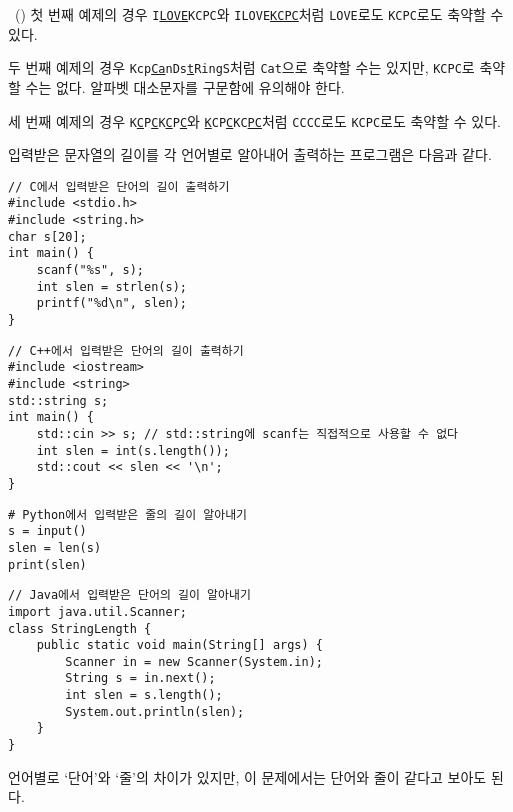\begin{problem}{\kcpcprobacronym\ (\kcpcprobacronymshort)}
    \Explanation
    첫 번째 예제의 경우 \texttt{I\underline{LOVE}KCPC}와 \texttt{ILOVE\underline{KCPC}}처럼 \texttt{LOVE}로도 \texttt{KCPC}로도 축약할 수 있다.
    
    두 번째 예제의 경우 \texttt{Kcp\underline{Ca}nDs\underline{t}RingS}처럼 \texttt{Cat}으로 축약할 수는 있지만, \texttt{KCPC}로 축약할 수는 없다. 알파벳 대소문자를 구문함에 유의해야 한다.
    
    세 번째 예제의 경우 \texttt{K\underline{C}P\underline{C}K\underline{C}P\underline{C}}와 \texttt{\underline{K}CP\underline{C}KC\underline{P}\underline{C}}처럼 \texttt{CCCC}로도 \texttt{KCPC}로도 축약할 수 있다.
    
    \Note
    입력받은 문자열의 길이를 각 언어별로 알아내어 출력하는 프로그램은 다음과 같다.
    
\begin{verbatim}
// C에서 입력받은 단어의 길이 출력하기
#include <stdio.h>
#include <string.h>
char s[20];
int main() {
    scanf("%s", s);
    int slen = strlen(s);
    printf("%d\n", slen);
}
\end{verbatim}
\begin{verbatim}
// C++에서 입력받은 단어의 길이 출력하기
#include <iostream>
#include <string>
std::string s;
int main() {
    std::cin >> s; // std::string에 scanf는 직접적으로 사용할 수 없다
    int slen = int(s.length());
    std::cout << slen << '\n';
}
\end{verbatim}
\begin{verbatim}
# Python에서 입력받은 줄의 길이 알아내기
s = input()
slen = len(s)
print(slen)
\end{verbatim}
\begin{verbatim}
// Java에서 입력받은 단어의 길이 알아내기
import java.util.Scanner;
class StringLength {
    public static void main(String[] args) {
        Scanner in = new Scanner(System.in);
        String s = in.next();
        int slen = s.length();
        System.out.println(slen);
    }
}
\end{verbatim}
언어별로 `단어'와 `줄'의 차이가 있지만, 이 문제에서는 단어와 줄이 같다고 보아도 된다.

\end{problem}

